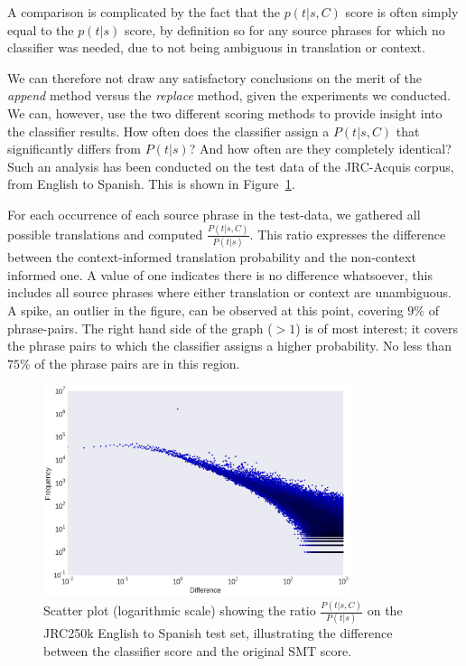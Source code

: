 \documentclass[smallextended]{svjour3}       %
\theoremstyle{break}
\begin{document}
A comparison is complicated by the fact that the $p(t|s,C)$ score is often simply
equal to the $p(t|s)$ score, by definition so for any source phrases for which no
classifier was needed, due to not being ambiguous in translation or context. 

We can therefore not draw any satisfactory conclusions on the merit of the
\emph{append} method versus the \emph{replace} method, given the experiments we
conducted. We can, however, use the two different scoring methods to provide
insight into the classifier results. How often does the classifier assign a
$P(t|s,C)$ that significantly differs from $P(t|s)$? And how often are they
completely identical?  Such an analysis has been conducted on the test data of
the JRC-Acquis corpus, from English to Spanish. This is shown in
Figure~\ref{fig:scoredifference}.

For each occurrence of each source phrase in the test-data, we gathered all
possible translations and computed $\frac{P(t|s,C)}{P(t|s)}$. This ratio
expresses the difference between the context-informed translation probability
and the non-context informed one. A value of one indicates there is no
difference whatsoever, this includes all source phrases where either
translation or context are unambiguous. A spike, an outlier in the figure, can
be observed at this point, covering $9\%$ of phrase-pairs. The right hand side
of the graph ($>1$) is of most interest; it covers the phrase pairs to which
the classifier assigns a higher probability. No less than $75\%$ of the phrase
pairs are in this region.

\begin{figure}
\begin{center}
\includegraphics[width=90.00mm]{scoredifference.png}
\caption{Scatter plot (logarithmic scale) showing the ratio
$\frac{P(t|s,C)}{P(t|s)}$ on the  JRC250k English to Spanish test set, illustrating the difference between the classifier score and the original SMT score.}
\label{fig:scoredifference}
\end{center}
\end{figure}
\end{document}
